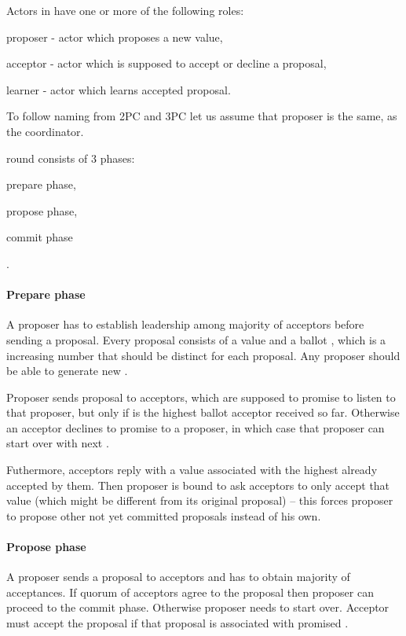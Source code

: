 Actors in \paxos have one or more of the following roles: \begin{enumerate*}[label=\alph*)]
\item proposer - actor which proposes a new value,
\item acceptor - actor which is supposed to accept or decline a proposal,
\item learner - actor which learns accepted proposal.
\end{enumerate*} To follow naming from 2PC and 3PC let us assume that proposer is the same, as the coordinator.

\paxos round consists of $3$ phases: \begin{enumerate*}[label=\alph*)] \item prepare phase, \item propose phase, \item commit phase \end{enumerate*}.

\paragraph{Prepare phase}
A proposer has to establish leadership among majority of acceptors before sending a proposal. Every proposal consists of a value and a ballot \ballot, which is a increasing number that should be distinct for each proposal. Any proposer should be able to generate new \ballot.

Proposer sends proposal \ballot to acceptors, which are supposed to promise to listen to that proposer, but only if \ballot is the highest ballot acceptor received so far. Otherwise an acceptor declines to promise to a proposer, in which case that proposer can start over with next \ballot. 

Futhermore, acceptors reply with a value associated with the highest \ballot already accepted by them. Then proposer is bound to ask acceptors to only accept that value (which might be different from its original proposal) -- this forces proposer to propose other not yet committed proposals instead of his own.

\paragraph{Propose phase}
A proposer sends a proposal to acceptors and has to obtain majority of acceptances. If quorum of acceptors agree to the proposal then proposer can proceed to the commit phase. Otherwise proposer needs to start over. Acceptor must accept the proposal if that proposal is associated with promised \ballot.

